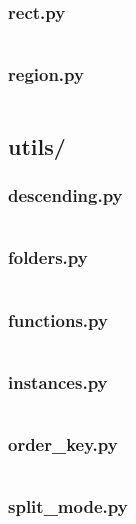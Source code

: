 \subsubsection{rect.py}\label{subsubsec:rect.py}
\inputminted{py}{src/model/rect.py}

\subsubsection{region.py}\label{subsubsec:region.py}
\inputminted{py}{src/model/region.py}

\subsection{utils/}\label{subsec:utils/}

\subsubsection{descending.py}\label{subsubsec:descending.py}
\inputminted{py}{src/utils/descending.py}

\subsubsection{folders.py}\label{subsubsec:folders.py}
\inputminted{py}{src/utils/folders.py}

\subsubsection{functions.py}\label{subsubsec:functions.py}
\inputminted{py}{src/utils/functions.py}

\subsubsection{instances.py}\label{subsubsec:instances.py}
\inputminted{py}{src/utils/instances.py}

\subsubsection{order\_key.py}\label{subsubsec:order_key.py}
\inputminted{py}{src/utils/order_key.py}

\subsubsection{split\_mode.py}\label{subsubsec:split_mode.py}
\inputminted{py}{src/utils/split_mode.py}
